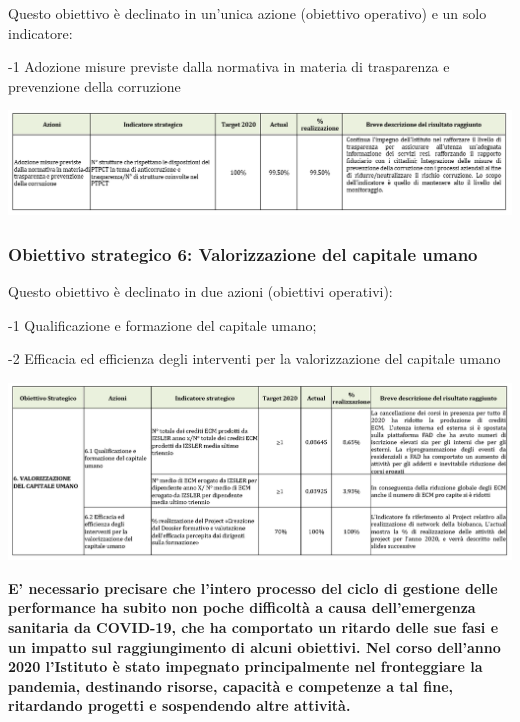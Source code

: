 \documentclass[
  12pt,
]{article}
\begin{document}
Questo obiettivo è declinato in un'unica azione (obiettivo operativo) e
un solo indicatore:

-1 Adozione misure previste dalla normativa in materia di trasparenza e
prevenzione della corruzione

\begin{center}\includegraphics[width=1.1\linewidth]{figure/ob5} \end{center}

\newpage

\hypertarget{obiettivo-strategico-6-valorizzazione-del-capitale-umano}{%
\subsubsection*{\texorpdfstring{Obiettivo strategico 6:
\textbf{Valorizzazione del capitale
umano}}{Obiettivo strategico 6: Valorizzazione del capitale umano}}\label{obiettivo-strategico-6-valorizzazione-del-capitale-umano}}

Questo obiettivo è declinato in due azioni (obiettivi operativi):

-1 Qualificazione e formazione del capitale umano;

-2 Efficacia ed efficienza degli interventi per la valorizzazione del
capitale umano

\begin{center}\includegraphics[width=1.1\linewidth]{figure/ob6} \end{center}

\textbf{E' necessario precisare che l'intero processo del ciclo di
gestione delle performance ha subito non poche difficoltà a causa
dell'emergenza sanitaria da COVID-19, che ha comportato un ritardo delle
sue fasi e un impatto sul raggiungimento di alcuni obiettivi. Nel corso
dell'anno 2020 l'Istituto è stato impegnato principalmente nel
fronteggiare la pandemia, destinando risorse, capacità e competenze a
tal fine, ritardando progetti e sospendendo altre attività.}
\end{document}
